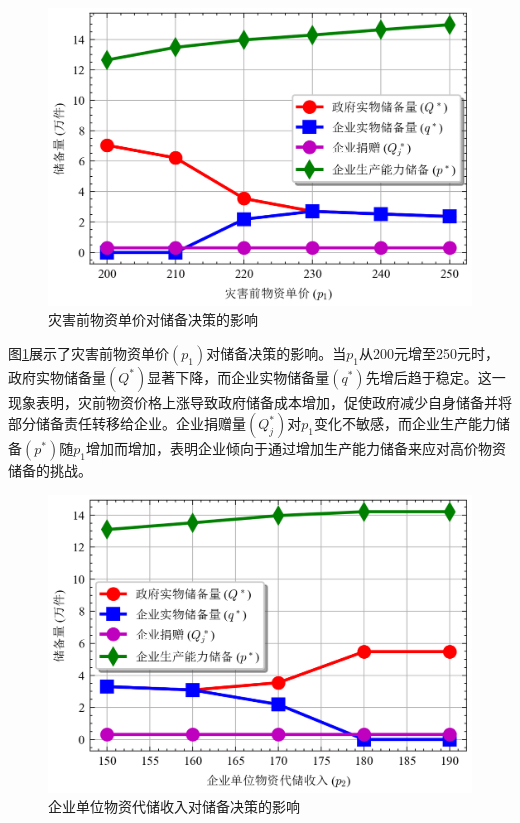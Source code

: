 \documentclass[a4paper,8pt,twocolumn]{article} %
\begin{document}
\begin{figure}[H]
\centering
\includegraphics[width=\linewidth]{basic_pictures/sensitivity_p1.png}
\caption{灾害前物资单价对储备决策的影响}
\label{fig:sensitivity_p1}
\end{figure}
图\ref{fig:sensitivity_p1}展示了灾害前物资单价$(p_1)$对储备决策的影响。当$p_1$从200元增至250元时，政府实物储备量$(Q^*)$显著下降，而企业实物储备量$(q^*)$先增后趋于稳定。这一现象表明，灾前物资价格上涨导致政府储备成本增加，促使政府减少自身储备并将部分储备责任转移给企业。企业捐赠量$(Q_j^*)$对$p_1$变化不敏感，而企业生产能力储备$(p^*)$随$p_1$增加而增加，表明企业倾向于通过增加生产能力储备来应对高价物资储备的挑战。
\begin{figure}[H]
\centering
\includegraphics[width=\linewidth]{basic_pictures/sensitivity_p2.png}
\caption{企业单位物资代储收入对储备决策的影响}
\label{fig:sensitivity_p2}
\end{figure}
\end{document}
